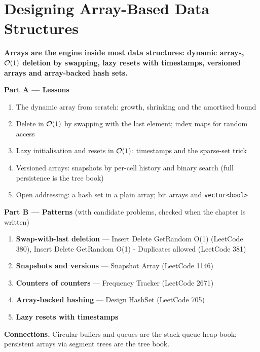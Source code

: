 \chapter{Designing Array-Based Data Structures}
\label{ch:design}

\begin{tcolorbox}[enhanced, colback=white, colframe=secondaryblue, boxrule=1pt, arc=2mm]
\textbf{\large\textcolor{primaryblue}{Arrays are the engine inside most data structures: dynamic arrays, $\mathcal{O}(1)$ deletion by swapping, lazy resets with timestamps, versioned arrays and array-backed hash sets.}}
\end{tcolorbox}


\begin{plannedbox}
\textbf{Part A --- Lessons}
\begin{enumerate}[leftmargin=*, label=\textbf{A\arabic*.}, itemsep=1pt]
    \item The dynamic array from scratch: growth, shrinking and the amortised bound
    \item Delete in $\mathcal{O}(1)$ by swapping with the last element; index maps for random access
    \item Lazy initialisation and resets in $\mathcal{O}(1)$: timestamps and the sparse-set trick
    \item Versioned arrays: snapshots by per-cell history and binary search (full persistence is the tree book)
    \item Open addressing: a hash set in a plain array; bit arrays and \texttt{vector<bool>}
\end{enumerate}
\textbf{Part B --- Patterns} (with candidate problems, checked when the chapter is written)
\begin{enumerate}[leftmargin=*, label=\textbf{P\arabic*.}, itemsep=1pt]
    \item \textbf{Swap-with-last deletion} --- Insert Delete GetRandom O(1) {\small\color{darkgray}(LeetCode 380)}, Insert Delete GetRandom O(1) - Duplicates allowed {\small\color{darkgray}(LeetCode 381)}
    \item \textbf{Snapshots and versions} --- Snapshot Array {\small\color{darkgray}(LeetCode 1146)}
    \item \textbf{Counters of counters} --- Frequency Tracker {\small\color{darkgray}(LeetCode 2671)}
    \item \textbf{Array-backed hashing} --- Design HashSet {\small\color{darkgray}(LeetCode 705)}
    \item \textbf{Lazy resets with timestamps}
\end{enumerate}
\textbf{Connections.} Circular buffers and queues are the stack-queue-heap book; persistent arrays via segment trees are the tree book.
\end{plannedbox}
